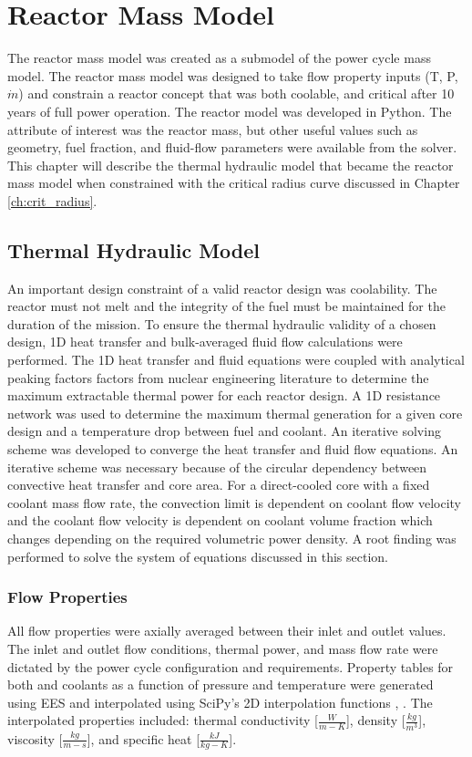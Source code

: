 \chapter{Reactor Mass Model} \label{ch:mass_model}
The reactor mass model was created as a submodel of the power cycle mass
model. The reactor mass model was designed to take flow property inputs (T, P,
$\dot{m}$) and constrain a reactor concept that was both coolable, and critical
after 10 years of full power operation. The reactor model was developed in
Python. The attribute of interest was the reactor mass, but other useful values such as geometry, fuel fraction,
and fluid-flow parameters were available from the solver. This chapter will
describe the thermal hydraulic model that became the reactor mass model when
constrained with the critical radius curve discussed in Chapter
\ref{ch:crit_radius}.

\section{Thermal Hydraulic Model}
An important design constraint of a valid reactor design was coolability. The reactor must
not melt and the integrity of the fuel must be maintained for the duration of
the mission. To ensure the thermal hydraulic validity of a chosen design, 
1D heat transfer and bulk-averaged fluid flow calculations were performed. The 1D
heat transfer and fluid equations were coupled with analytical peaking factors
factors from nuclear engineering literature to determine the maximum extractable
thermal power for each reactor design. A 1D resistance network was used to
determine the maximum thermal generation for a given core design and a temperature
drop between fuel and coolant. An iterative solving scheme was developed to
converge the heat transfer and fluid flow equations. An iterative scheme was
necessary because of the circular dependency between convective heat transfer and core
area. For a direct-cooled core with a fixed coolant mass flow rate, 
the convection limit is dependent on coolant flow velocity and the
coolant flow velocity is dependent on coolant volume fraction which changes
depending on the required volumetric power density. A root finding was performed
to solve the system of equations discussed in this section.

\subsection{Flow Properties}
All flow properties were axially averaged between their inlet and outlet values.
The inlet and outlet flow conditions, thermal power, and mass flow rate were
dictated by the power cycle configuration and requirements. Property tables for
both \codiox and \water coolants as a function of pressure and temperature were 
generated using EES and interpolated using SciPy's 2D interpolation functions
\citep{scipy}, \citep{EES_citation}.
The interpolated properties included: thermal conductivity [$\frac{W}{m-K}$], density
[$\frac{kg}{m^3}$], viscosity [$\frac{kg}{m-s}$], and specific heat [$\frac{kJ}{kg-K}$].

